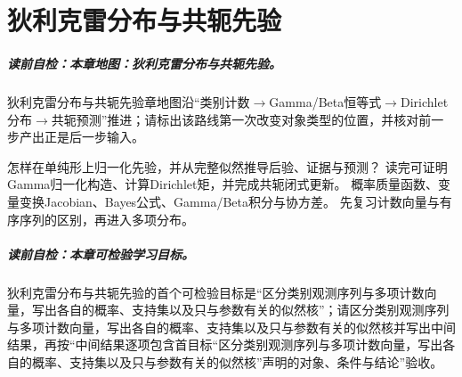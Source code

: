 
\chapter{狄利克雷分布与共轭先验}\label{chap:V5-C05}

\paragraph{读前自检：本章地图：狄利克雷分布与共轭先验。}狄利克雷分布与共轭先验章地图沿“类别计数$\to$Gamma/Beta恒等式$\to$Dirichlet分布$\to$共轭预测”推进；请标出该路线第一次改变对象类型的位置，并核对前一步产出正是后一步输入。\par

{怎样在单纯形上归一化先验，并从完整似然推导后验、证据与预测？}
{读完可证明Gamma归一化构造、计算Dirichlet矩，并完成共轭闭式更新。}
{概率质量函数、变量变换Jacobian、Bayes公式、Gamma/Beta积分与协方差。}
{先复习计数向量与有序序列的区别，再进入多项分布。}
\label{struct:V5-C05-CH01}
\paragraph{读前自检：本章可检验学习目标。}狄利克雷分布与共轭先验的首个可检验目标是“区分类别观测序列与多项计数向量，写出各自的概率、支持集以及只与参数有关的似然核”；请区分类别观测序列与多项计数向量，写出各自的概率、支持集以及只与参数有关的似然核并写出中间结果，再按“中间结果逐项包含首目标“区分类别观测序列与多项计数向量，写出各自的概率、支持集以及只与参数有关的似然核”声明的对象、条件与结论”验收。\par

